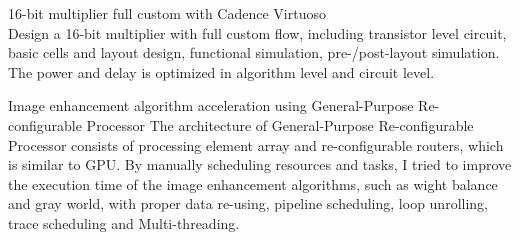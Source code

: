 \documentclass[10pt,a4paper]{article} %
\begin{document}

\inlineheadsection %
{
    16-bit multiplier full custom with Cadence Virtuoso\\
}
{
    Design a 16-bit multiplier with full custom flow,
    including transistor level circuit, basic cells and layout design, functional simulation, pre-/post-layout simulation.
    The power and delay is optimized in algorithm level and circuit level.
}

\inlineheadsection %
{
    Image enhancement algorithm acceleration using General-Purpose Re-configurable Processor
}
{
    The architecture of General-Purpose Re-configurable Processor consists of processing element array and re-configurable routers, which is similar to GPU.
    By manually scheduling resources and tasks, I tried to improve the execution time of the image enhancement algorithms, such as wight balance and gray world,
    with proper data re-using, pipeline scheduling, loop unrolling,  trace scheduling and Multi-threading.
}

\spacedhrule{1.5em}{-0.4em} %


\end{document}
